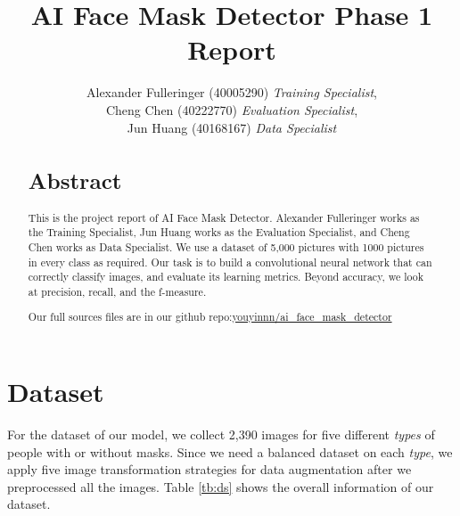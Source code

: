 \documentclass[stu, floatsintext, 10pt, donotrepeattitle, natbib]{apa7}
\title{AI Face Mask Detector Phase 1 Report}
\author{
    Alexander Fulleringer (40005290) \textit{Training Specialist}, \\
    Cheng Chen (40222770) \textit{Evaluation Specialist}, \\
    Jun Huang (40168167) \textit{Data Specialist}
}
\begin{document}
\maketitle


\begin{abstract}

	\section{Abstract}

	This is the project report of AI Face Mask Detector.
	Alexander Fulleringer works as the Training Specialist, Jun Huang works as the Evaluation Specialist, and Cheng Chen works as Data Specialist.
	We use a dataset of 5,000 pictures with 1000 pictures in every class as required.
	Our task is to build a convolutional neural network that can correctly classify images, and evaluate its learning metrics.
	Beyond accuracy, we look at precision, recall, and the f-measure.

	Our full sources files are in our github repo:\href{https://github.com/youyinnn/ai_face_mask_detector}{youyinnn/ai\_face\_mask\_detector}

\end{abstract}

\newpage
\section{Dataset}

For the dataset of our model, we collect 2,390 images for five different \textit{types} of people with or without masks.
Since we need a balanced dataset on each \textit{type}, we apply five image transformation strategies for data augmentation after we preprocessed all the images.
Table \ref{tb:ds} shows the overall information of our dataset.
\end{document}
